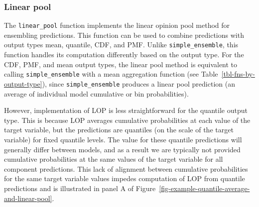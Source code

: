 \documentclass[
  article,
  shortnames,
  notitle]{jss}
\begin{document}
\begin{longtable}[]
\caption{Summary of ensemble function calculations for each output type.
The ensemble function (columns) determines the operation that is
performed, and in the case of probabilistic output types
(\texttt{quantile}, \texttt{cdf}, \texttt{pmf}), this also determines
what ensemble distribution is generated (quantile average,
\(F_{Q}^{-1}(\theta)\), or linear pool, \(F_{LOP}(x)\)). The resulting
ensemble will be returned in the same output type as the inputs. Thus,
the output type (rows) determines how the resulting ensemble
distribution is summarized (as a quantile function, \(F^{-1}(\theta)\),
cumulative distribution function, \(F(x)\), or probability mass function
\(f(x)\)). Estimating individual model cumulative probabilities is
required to compute a \texttt{linear\_pool()} for predictions of
\texttt{quantile} output type; see Section~\ref{sec-linear-pool} for
details. In the case of \texttt{simple\_ensemble()}, we report the
calculations for the default case where \texttt{agg\_fun\ =\ "mean"};
however, if another aggregation function is chosen (e.g.,
\texttt{agg\_fun\ =\ "median"}), that calculation would be performed
instead. For example,
\texttt{simple\_ensemble(...,\ agg\_fun\ =\ "median")} applied to
predictions of \texttt{mean} output type would return the median of
individual model means.}\label{tbl-fns-by-output-type}\tabularnewline
\end{longtable}

\subsubsection{Linear pool}\label{sec-linear-pool}

The \texttt{linear\_pool} function implements the linear opinion pool
method for ensembling predictions. This function can be used to combine
predictions with output types mean, quantile, CDF, and PMF. Unlike
\texttt{simple\_ensemble}, this function handles its computation
differently based on the output type. For the CDF, PMF, and mean output
types, the linear pool method is equivalent to calling
\texttt{simple\_ensemble} with a mean aggregation function (see
Table~\ref{tbl-fns-by-output-type}), since \texttt{simple\_ensemble}
produces a linear pool prediction (an average of individual model
cumulative or bin probabilities).

However, implementation of LOP is less straightforward for the quantile
output type. This is because LOP averages cumulative probabilities at
each value of the target variable, but the predictions are quantiles (on
the scale of the target variable) for fixed quantile levels. The value
for these quantile predictions will generally differ between models, and
as a result we are typically not provided cumulative probabilities at
the same values of the target variable for all component predictions.
This lack of alignment between cumulative probabilities for the same
target variable values impedes computation of LOP from quantile
predictions and is illustrated in panel A of
Figure~\ref{fig-example-quantile-average-and-linear-pool}.
\end{document}
